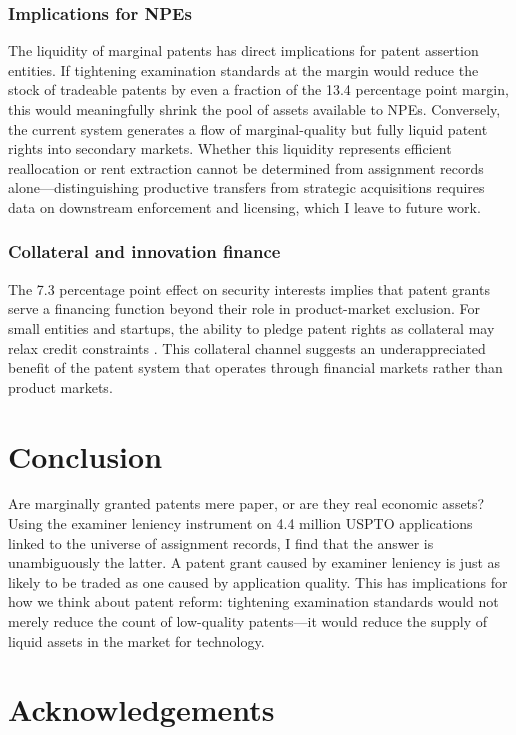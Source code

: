 \documentclass[12pt]{article}
\begin{document}
\subsubsection*{Implications for NPEs} The liquidity of marginal patents has direct implications for patent assertion entities. If tightening examination standards at the margin would reduce the stock of tradeable patents by even a fraction of the 13.4 percentage point margin, this would meaningfully shrink the pool of assets available to NPEs. Conversely, the current system generates a flow of marginal-quality but fully liquid patent rights into secondary markets. Whether this liquidity represents efficient reallocation \citep{serrano2010dynamics} or rent extraction \citep{cohen2019patent} cannot be determined from assignment records alone---distinguishing productive transfers from strategic acquisitions requires data on downstream enforcement and licensing, which I leave to future work.

\subsubsection*{Collateral and innovation finance} The 7.3 percentage point effect on security interests implies that patent grants serve a financing function beyond their role in product-market exclusion. For small entities and startups, the ability to pledge patent rights as collateral may relax credit constraints \citep{farremensa2020patent, gans2008strategy}. This collateral channel suggests an underappreciated benefit of the patent system that operates through financial markets rather than product markets.


\section{Conclusion}

Are marginally granted patents mere paper, or are they real economic assets? Using the examiner leniency instrument on 4.4 million USPTO applications linked to the universe of assignment records, I find that the answer is unambiguously the latter. A patent grant caused by examiner leniency is just as likely to be traded as one caused by application quality. This has implications for how we think about patent reform: tightening examination standards would not merely reduce the count of low-quality patents---it would reduce the supply of liquid assets in the market for technology.


\section*{Acknowledgements}
\end{document}
